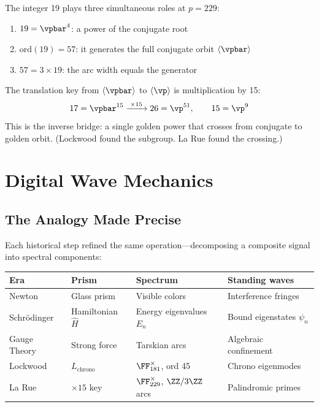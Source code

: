 The integer 19 plays three simultaneous roles at $p = 229$:
\begin{enumerate}[label=(\alph*)]
\item $19 = \vpbar^4$: a power of the conjugate root
\item $\mathrm{ord}(19) = 57$: it generates the full conjugate orbit $\langle \vpbar \rangle$
\item $57 = 3 \times 19$: the arc width equals the generator
\end{enumerate}

The translation key from $\langle \vpbar \rangle$ to $\langle \vp \rangle$ is multiplication by 15:
\begin{equation}\label{eq:key}
17 = \vpbar^{15} \xrightarrow{\;\times 15\;} 26 = \vp^{51}, \qquad 15 = \vp^9
\end{equation}
This is the inverse bridge: a single golden power that crosses from conjugate to golden orbit. (Lockwood found the subgroup. La Rue found the crossing.)


\section{Digital Wave Mechanics}

\subsection{The Analogy Made Precise}

Each historical step refined the same operation---decomposing a composite signal into spectral components:

\begin{center}
\begin{tabular}{@{}llll@{}}
\toprule
\textbf{Era} & \textbf{Prism} & \textbf{Spectrum} & \textbf{Standing waves} \\
\midrule
Newton & Glass prism & Visible colors & Interference fringes \\
Schr\"odinger & Hamiltonian $\hat{H}$ & Energy eigenvalues $E_n$ & Bound eigenstates $\psi_n$ \\
Gauge Theory & Strong force & Tarskian arcs & Algebraic confinement \\
Lockwood & $L_{\mathrm{chrono}}$ & $\FF_{181}^\times$, ord 45 & Chrono eigenmodes \\
La Rue & $\times 15$ key & $\FF_{229}^\times$, $\ZZ/3\ZZ$ arcs & Palindromic primes \\
\bottomrule
\end{tabular}
\end{center}

